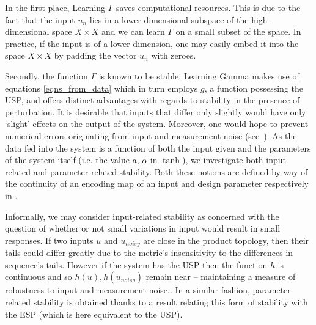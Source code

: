 \documentclass[a4paper,12pt,twoside]{report}
\begin{document}
In the first place, Learning $\Gamma$ saves computational resources. This is due to the fact that the input $u_n$ lies in a lower-dimensional subspace of the high-dimensional space $X\times{X}$ and we can learn $\Gamma$ on a small subset of the space. In practice, if the input is of a  lower dimension, one may easily embed it into the space $X\times{X}$ by padding the vector $u_n$ with zeroes.

Secondly, the function $\Gamma$ is known to be stable. Learning Gamma makes use of equations \ref{eqns_from_data} which in turn employs $g$, a function possessing the USP, and offers distinct advantages with regards to stability in the presence of perturbation. It is desirable that inputs that differ only slightly would have only ‘slight’ effects on the output of the system. Moreover, one would hope to prevent numerical errors originating from input and measurement noise (see~\cite[Th. 5]{manjunath2021universal}). 
As the data fed into the system is a function of both the input given and the parameters of the system itself (i.e. the value a, $\alpha$ in $\tanh$), we investigate both input-related and parameter-related stability. Both these notions are defined by way of the continuity of an encoding map of an input and design parameter respectively in \cite{manjunath2020stability}.\

Informally, we may consider input-related stability as concerned with the question of whether or not small variations in input would result in small responses.   
If two inputs $u$ and $u_{noisy}$ are close in the product topology, then their tails could differ greatly due to the metric's insensitivity to the differences in sequence's tails.
 However if the system has the USP then the function $h$ is continuous and so $h(u), h(u_{noisy})$ remain near – maintaining a measure of robustness to input and measurement noise.\cite{manjunath2021universal}.
In a similar fashion, parameter-related stability is obtained thanks to a result \cite[Lemma 3.2]{manjunath2020stability} relating this form of stability with the ESP (which is here equivalent to the USP).


\end{document}
